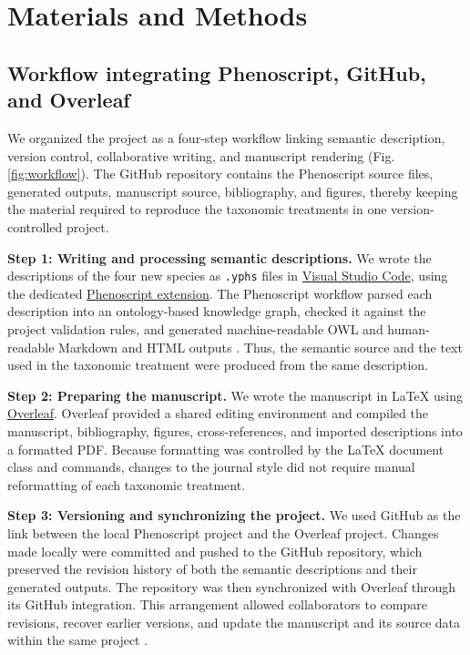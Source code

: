 \documentclass[fleqn,10pt,lineno]{wlpeerj}
\begin{document}
\section*{Materials and Methods}



\subsection*{Workflow integrating Phenoscript, GitHub, and Overleaf}

We organized the project as a four-step workflow linking semantic description, version control, collaborative writing, and manuscript rendering (Fig. \ref{fig:workflow}). The GitHub repository contains the Phenoscript source files, generated outputs, manuscript source, bibliography, and figures, thereby keeping the material required to reproduce the taxonomic treatments in one version-controlled project.

\textbf{Step 1: Writing and processing semantic descriptions.}
We wrote the descriptions of the four new species as \texttt{.yphs} files in \href{https://code.visualstudio.com/}{Visual Studio Code}, using the dedicated \href{https://marketplace.visualstudio.com/items?itemName=Tarasov-Lab.phenoscript}{Phenoscript extension}. The Phenoscript workflow parsed each description into an ontology-based knowledge graph, checked it against the project validation rules, and generated machine-readable OWL and human-readable Markdown and HTML outputs \citep{montanaro2024beyond, montanaro2024computable}. Thus, the semantic source and the text used in the taxonomic treatment were produced from the same description.

\textbf{Step 2: Preparing the manuscript.}
We wrote the manuscript in \LaTeX{} using \href{https://www.overleaf.com/}{Overleaf}. Overleaf provided a shared editing environment and compiled the manuscript, bibliography, figures, cross-references, and imported descriptions into a formatted PDF. Because formatting was controlled by the \LaTeX{} document class and commands, changes to the journal style did not require manual reformatting of each taxonomic treatment.

\textbf{Step 3: Versioning and synchronizing the project.}
We used GitHub as the link between the local Phenoscript project and the Overleaf project. Changes made locally were committed and pushed to the GitHub repository, which preserved the revision history of both the semantic descriptions and their generated outputs. The repository was then synchronized with Overleaf through its GitHub integration. This arrangement allowed collaborators to compare revisions, recover earlier versions, and update the manuscript and its source data within the same project \citep{ram2013git, braga2023github}.
\end{document}
